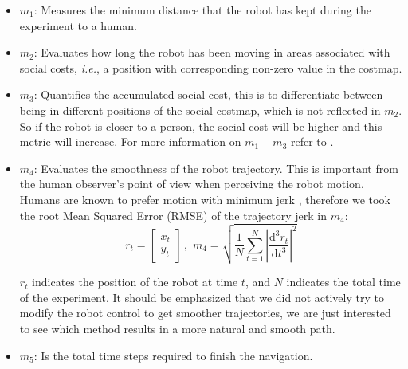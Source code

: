 \begin{itemize}[ noitemsep, leftmargin=*]

\item $m_{1}$: Measures the minimum distance that the robot has kept during the experiment to a human.%


\item $m_{2}$: Evaluates how long the robot has been moving in areas associated with social costs, \textit{i.e.}, a position with corresponding non-zero value in the costmap.

\item $m_{3}$: Quantifies the accumulated social cost, this is to differentiate between being in different positions of the social costmap, which is not reflected in $m_{2}$. So if the robot is closer to a person, the social cost will be higher and this metric will increase. For more information on $m_{1}-m_{3}$ refer to \cite{talebpour2015board}. 

\item  $m_{4}$: Evaluates the smoothness of the robot trajectory. This is important from the human observer's point of view when perceiving the robot motion. Humans are known to prefer motion with minimum jerk \cite{sisbot2010synthesizing}, therefore we took the root Mean Squared Error (RMSE) of the trajectory jerk in $m_{4}$:
\begin{equation}
r_{t} = \begin{bmatrix}
x_{t}\\
y_{t} 

\end{bmatrix} \, , \, \,  
m_{4} = \sqrt{\frac{1}{N} \sum_{t=1}^{N}\left | \frac{\mathrm{d^3} r_{t} }{\mathrm{d} t^3} \right |^{2}  }
\end{equation}


$r_{t}$ indicates the position of the robot at time $t$, and $N$ indicates the total time of the experiment. It should be emphasized that we did not actively try to modify the robot control to get smoother trajectories, we are just interested to see which method results in a more natural and smooth path.  

\item $m_{5}$: Is the total time steps required to finish the navigation.%



\end{itemize}

